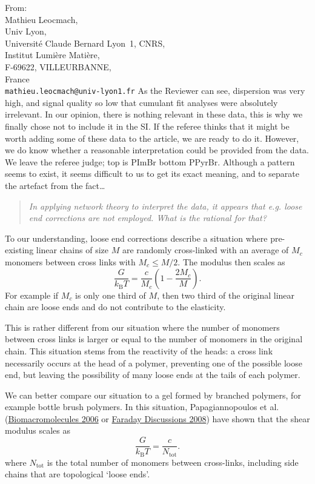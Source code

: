 \documentclass[a4paper, parskip=true, firsthead=false, fromemail=true, foldmarks=false]{scrlttr2}
\newenvironment{quotationi}
{\begin{quotation}\itshape}
{\end{quotation}}
\begin{document}
\begin{letter}{From:\\
Mathieu Leocmach,\\
Univ Lyon,\\ 
Universit\'e Claude Bernard Lyon~1, CNRS,\\
Institut Lumi\`ere Mati\`ere,\\
F-69622, VILLEURBANNE,\\
France\\
\texttt{mathieu.leocmach@univ-lyon1.fr}
}
As the Reviewer can see, dispersion was very high, and signal quality so low that cumulant fit analyses were absolutely irrelevant. In our opinion, there is nothing relevant in these data, this is why we finally chose not to include it in the SI. If the referee thinks that it might be worth adding some of these data to the article, we are ready to do it. However, we do know whether a reasonable interpretation could be provided from the data. We leave the referee judge; top is PImBr bottom PPyrBr. Although a pattern seems to exist, it seems difficult to us to get its exact meaning, and to separate the artefact from the fact\ldots

\begin{quotationi}
In applying network theory to interpret the data, it appears that e.g. loose end corrections are not employed. What is the rational for that?
\end{quotationi}

To our understanding, loose end corrections describe a situation where pre-existing linear chains of size $M$ are randomly cross-linked with an average of $M_c$ monomers between cross links with $M_c\leq M/2$. The modulus then scales as
\begin{equation}
\frac{G}{k_\mathrm{B}T} = \frac{c}{M_c}  \left(1 - \frac{2M_c}{M}\right).
\end{equation}
For example if $M_c$ is only one third of $M$, then two third of the original linear chain are loose ends and do not contribute to the elasticity.

This is rather different from our situation where the number of monomers between cross links is larger or equal to the number of monomers in the original chain. This situation stems from the reactivity of the heads: a cross link necessarily occurs at the head of a polymer, preventing one of the possible loose end, but leaving the possibility of many loose ends at the tails of each polymer.

We can better compare our situation to a gel formed by branched polymers, for example bottle brush polymers. In this situation, Papagiannopoulos et al. (\href{http://doi.org/10.1021/bm060287d}{Biomacromolecules 2006} or \href{http://doi.org/10.1039/b714864j}{Faraday Discussions 2008}) have shown that the shear modulus scales as
\begin{equation}
\frac{G}{k_\mathrm{B}T} = \frac{c}{N_\mathrm{tot}}.
\end{equation}
where $N_\mathrm{tot}$ is the total number of monomers between cross-links, including side chains that are topological `loose ends'. 


\end{letter}
\end{document}
